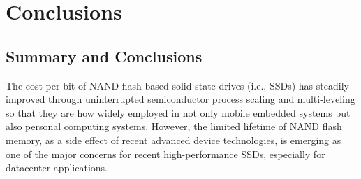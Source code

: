 
\chapter{Conclusions}
\label{chap:Conclusions}

\section{Summary and Conclusions}


The cost-per-bit of NAND flash-based solid-state drives (i.e., SSDs) has steadily improved through uninterrupted semiconductor process scaling and multi-leveling so that they are how widely employed in not only mobile embedded systems but also personal computing systems.
However, the limited lifetime of NAND flash memory, as a side effect of recent advanced device technologies, is emerging as one of the major concerns for recent high-performance SSDs, especially for datacenter applications.


